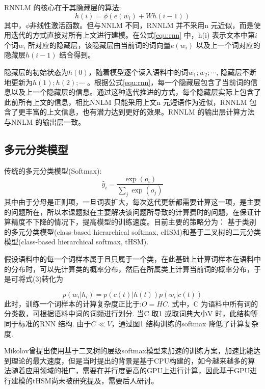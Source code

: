 \documentclass[twoside]{buaathesis}
\begin{document}
RNNLM 的核心在于其隐藏层的算法:
\begin{equation}
\label{equ:rnn}
h(i) =\phi(e(w_i) +Wh(i -1))
\end{equation}
其中，$\phi$非线性激活函数。但与NNLM 不同，RNNLM 并不采用n 元近似，而是使用迭代的方式直接对所有上文进行建模。在公式\ref{equ:rnn} 中，h(i) 表示文本中第$i$ 个词$w_i$ 所对应的隐藏层，该隐藏层由当前词的词向量$e(w_i)$ 以及上一个词对应的隐藏层$h(i -1)$ 结合得到。

隐藏层的初始状态为$h(0)$，随着模型逐个读入语料中的词$w_1;w_2; \cdots $, 隐藏层不断地更新为$h(1);h(2); \cdots$ 。根据公式\ref{equ:rnn}，每一个隐藏层包含了当前词的信息以及上一个隐藏层的信息。通过这种迭代推进的方式，每个隐藏层实际上包含了此前所有上文的信息，相比NNLM 只能采用上文n 元短语作为近似，RNNLM 包含了更丰富的上文信息，也有潜力达到更好的效果。RNNLM 的输出层计算方法与NNLM 的输出层一致。


\subsection{多元分类模型}
传统的多元分类模型(Softmax):
\begin{equation}\label{equ:softmax}
  \hat y_i=\frac{\exp(o_i)}{\sum_j \exp(o_j)}
\end{equation}
其中由于分母是正则项，一旦词表扩大，每次迭代更新都需要计算这一项，是主要的问题所在，所以本课题拟在主要解决该问题所导致的计算费时的问题，在保证计算精度不下降的情况下，提高模型的训练速度。目前主要的策略分为： 基于类别的多元分类模型(class-based hierarchical softmax, cHSM)和基于二叉树的二元分类模型(class-based hierarchical softmax, tHSM).

假设语料中的每一个词样本属于且只属于一个类，在此基础上计算词样本在语料中的分布时，可以先计算类的概率分布，然后在所属类上计算当前词的概率分布，于是可将式(3)转化为

\begin{equation}\label{equ:class}
  p(w_i|h_i) = p(c(t)|h(t))p(w_i|c(t))
\end{equation}
此时，训练一个词样本的计算复杂度正比于:$O =HC$. 式中，C 为语料中所有词的分类数，可根据语料中词的词频进行划分. 当C 取1 或取词典大小V 时，此结构等同于标准的RNN 结构. 由于$C \ll V$，通过图1 结构训练的softmax 降低了计算复杂度.

Mikolov曾提出使用基于二叉树的层级softmax模型来加速的训练方案，加速比能达到理论的最大速度，但是当时提出的背景是基于CPU构建的，如今越来越多的算法随着应用领域的推广，需要在并行度更高的GPU上进行计算，因此基于GPU进行建模的tHSM尚未被研究提及，需要后人研讨。
\end{document}

